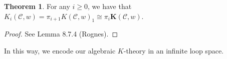 \documentclass[10pt,letterpaper,cm]{nupset}
\theoremstyle{definition}
\theoremstyle{theorem}
\newtheorem{theorem}{Theorem}
\theoremstyle{remark}
\newcommand{\1}{\mathbf{1}}
\renewcommand{\c}{\mathscr{C}}
\newcommand{\0}{\vec 0}
\begin{document}
\begin{theorem}
For any $i\geq 0$, we have that $K_i(\c, w) = \pi_{i+1}K(\c, w)_1 \cong \pi_i \mathbf{K}(\c, w)$.
\end{theorem}
\begin{proof}
See Lemma 8.7.4 (Rognes).
\end{proof}


In this way, we encode our algebraic $K$-theory in an infinite loop space.
\end{document}
